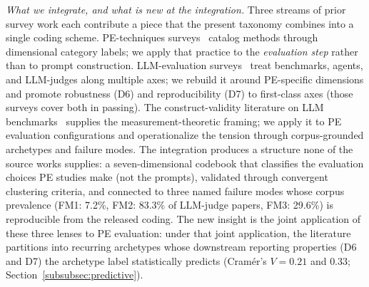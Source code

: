 \documentclass[acmsmall, nonacm, screen]{acmart}
\begin{document}
\textit{What we integrate, and what is new at the integration.}
Three streams of prior survey work each contribute a piece that the
present taxonomy combines into a single coding scheme.
PE-techniques surveys~\cite{schulhoff2024prompt, sahoo2024systematic,
vatsal2024survey, liu2026taxonomy} catalog methods through
dimensional category labels; we apply that practice to the
\emph{evaluation step} rather than to prompt construction.
LLM-evaluation surveys~\cite{chang2023survey, ni2025benchmarks,
mohammadi2025agents, gu2025llmjudge} treat benchmarks, agents, and
LLM-judges along multiple axes; we rebuild it around PE-specific
dimensions and promote robustness (D6) and reproducibility (D7) to
first-class axes (those surveys cover both in passing). The
construct-validity literature on LLM benchmarks~\cite{bean2025measuring,
alaa2025medical, ye2025psychometrics} supplies the
measurement-theoretic framing; we apply it to PE evaluation
configurations and operationalize the tension through corpus-grounded
archetypes and failure modes. The integration produces a structure
none of the source works supplies: a seven-dimensional codebook that
classifies the evaluation choices PE studies make (not the prompts),
validated through convergent clustering criteria, and connected to
three named failure modes whose corpus prevalence (FM1: 7.2\%, FM2:
83.3\% of LLM-judge papers, FM3: 29.6\%) is reproducible from the
released coding. The new insight is the joint application of these
three lenses to PE evaluation: under that joint application, the
literature partitions into recurring archetypes whose downstream
reporting properties (D6 and D7) the archetype label statistically
predicts (Cram\'er's $V = 0.21$ and $0.33$;
Section~\ref{subsubsec:predictive}).
\end{document}
